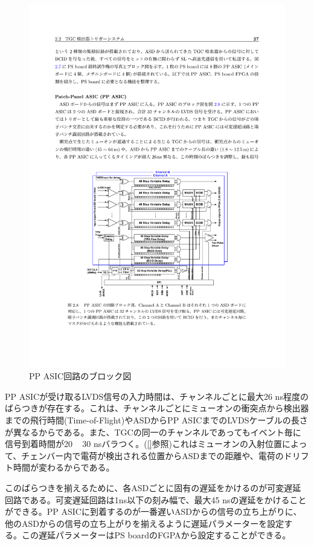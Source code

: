 \begin{figure} 
\centering
\includegraphics[width=16cm]{fig/Intro/TGC_PPASIC.pdf}
\caption[PP ASIC回路のブロック図]{PP ASIC回路のブロック図\cite{PPASIC}}
\label{TGC_PPASIC}
\end{figure}

PP ASICが受け取るLVDS信号の入力時間は、チャンネルごとに最大26 ns程度のばらつきが存在する。これは、チャンネルごとにミューオンの衝突点から検出器までの飛行時間(Time-of-Flight)やASDからPP ASICまでのLVDSケーブルの長さが異なるからである。また、TGCの同一のチャンネルであってもイベント毎に信号到着時間が20 ~ 30 nsバラつく。(\ref{}参照)これはミューオンの入射位置によって、チェンバー内で電荷が検出される位置からASDまでの距離や、電荷のドリフト時間が変わるからである。

このばらつきを揃えるために、各ASDごとに固有の遅延をかけるのが可変遅延回路である。可変遅延回路は1ns以下の刻み幅で、最大45 nsの遅延をかけることができる。PP ASICに到着するのが一番遅いASDからの信号の立ち上がりに、他のASDからの信号の立ち上がりを揃えるように遅延パラメーターを設定する。この遅延パラメーターはPS boardのFGPAから設定することができる。

